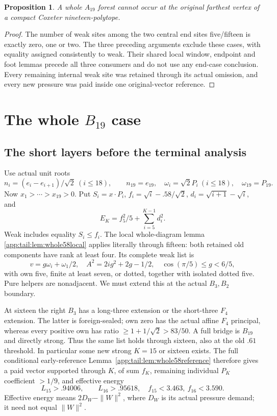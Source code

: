 \documentclass[11pt]{article}
\newtheorem{proposition}[theorem]{Proposition}
\theoremstyle{definition}
\theoremstyle{remark}
\begin{document}
\begin{proposition}\label{app:exact19:prop:wholeA19}
A whole \(A_{19}\) forest cannot occur
at the original farthest vertex of
a compact Coxeter nineteen-polytope.
\end{proposition}
\begin{proof}
The number of weak sites among the
two central end sites five/fifteen
is exactly zero, one or two.
The three preceding arguments
exclude these cases, with equality
assigned consistently to weak.
Their shared local window, endpoint
and foot lemmas precede all three
consumers and do not use any
end-case conclusion.
Every remaining internal weak
site was retained through its
actual omission, and every new
pressure was paid inside one
original-vector reference.
\end{proof}


\section[The whole B19 case]{The whole \(B_{19}\) case}
\label{app:exact19:wholeB19proof}
\subsection{The short layers before the terminal analysis}
\label{app:exact19:Bwindow}

Use actual unit roots
\[
 n_i=(e_i-e_{i+1})/\sqrt2\ (i\le18),\qquad n_{19}=e_{19},
 \quad \omega_i=\sqrt2P_i\ (i\le18),\quad\omega_{19}=P_{19}.
\]
Now \(x_1>\cdots>x_{19}>0\).
Put \(S_i=x\cdot P_i\),
\(f_i=\sqrt i-.58/\sqrt2\),
\(d_i=\sqrt{i+1}-\sqrt i\), and
\[
                         E_K=f_5^2/5+\sum_{i=5}^{K-1}d_i^2 .
\]
Weak includes equality \(S_i\le f_i\).
The local whole-diagram lemma
\ref{app:tail:lem:whole58local} applies
literally through fifteen:
both retained old components have
rank at least four.
Its complete weak list is
\[
 v=g\omega_i+\omega_1/2,\quad
 A^2=2ig^2+2g-1/2,\quad
 \cos(\pi/5)\le g<6/5,
\tag{B19packet}\label{app:exact19:eq:Bpacket}
\]
with own five, finite at least seven,
or dotted, together with isolated
dotted five.
Pure helpers are nonadjacent.
We must extend this at the actual
\(B_3,B_2\) boundary.

At sixteen the right \(B_3\) has
a long-three extension or the
short-three \(F_4\) extension.
The latter is foreign-sealed;
own zero has the actual affine
\(F_4\) principal, whereas every
positive own has ratio
\(\ge1+1/\sqrt2>83/50\).
A full bridge is \(B_{19}\) and
directly strong.
Thus the same list holds through
sixteen, also at the old \(.61\)
threshold.
In particular some new strong
\(K=15\) or sixteen exists.
The full conditional early-reference
Lemma~\ref{app:tail:lem:whole58reference}
therefore gives a paid vector
supported through \(K\), of sum
\(f_K\), remaining individual
\(P_K\) coefficient \(>1/9\), and
effective energy
\[
               L_{15}>.94006,\qquad L_{16}>.95618,
               \quad f_{15}<3.463,\ f_{16}<3.590 .
\tag{B19early}\label{app:exact19:eq:Bearly}
\]
Effective energy means \(2D_W-\|W\|^2\),
where \(D_W\) is its actual pressure
demand; it need not equal \(\|W\|^2\).
\end{document}
